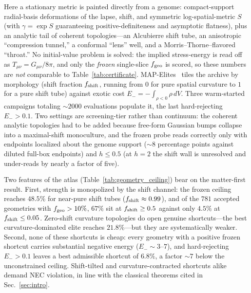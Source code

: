 \documentclass[twocolumn,floatfix,aps,prd,nofootinbib]{revtex4-2}
\begin{document}
Here a stationary metric is painted directly from a genome: compact-support
radial-basis deformations of the lapse, shift, and symmetric log-spatial-metric
$S$ (with $\gamma=\exp S$ guaranteeing positive-definiteness and asymptotic
flatness), plus an analytic tail of coherent topologies---an Alcubierre shift
tube, an anisotropic ``compression tunnel,'' a conformal ``lens'' well, and a
Morris--Thorne--flavored ``throat.'' No initial-value problem is solved: the
implied stress-energy is read off as $T_{\mu\nu}=G_{\mu\nu}/8\pi$, and only the
\emph{frozen} single-slice $f_{\rm geo}$ is scored, so these numbers are
\emph{not} comparable to Table~\ref{tab:certificate}.
MAP-Elites~\cite{mouret15} tiles the archive by morphology (shift fraction
$f_{\rm shift}$, running from $0$ for pure spatial curvature to $1$ for a pure
shift tube) against exotic cost $E_-=-\!\int_{\rho<0}\rho\,dV$. Three
warm-started campaigns totaling ${\sim}2000$ evaluations populate it, the last
hard-rejecting $E_->0.1$. Two settings are screening-tier rather than
continuum: the coherent analytic topologies had to be added because free-form
Gaussian bumps collapse into a maximal-shift monoculture, and the frozen probe
reads correctly only with endpoints localized about the genome support
(${\sim}8$ percentage points against diluted full-box endpoints) and $h\le0.5$
(at $h=2$ the shift wall is unresolved and under-reads by nearly a factor
of five).

Two features of the atlas (Table~\ref{tab:geometry_ceiling}) bear on the
matter-first result. First, strength is monopolized by the shift channel: the
frozen ceiling reaches $48.5\%$ for near-pure shift tubes
($f_{\rm shift}\approx0.99$), and of the $781$ accepted geometries with
$f_{\rm geo}>10\%$, $67\%$ sit at $f_{\rm shift}\ge0.5$ against only $4.5\%$ at
$f_{\rm shift}\le0.05$. Zero-shift curvature topologies do open genuine
shortcuts---the best curvature-dominated elite reaches $21.8\%$---but they are
systematically weaker. Second, none of these shortcuts is cheap: every geometry
with a positive frozen shortcut carries substantial negative energy
($E_-\sim3$--$7$), and hard-rejecting $E_->0.1$ leaves a best admissible
shortcut of $6.8\%$, a factor ${\sim}7$ below the unconstrained ceiling.
Shift-tilted and curvature-contracted shortcuts alike demand NEC violation, in
line with the classical theorems cited in Sec.~\ref{sec:intro}.
\end{document}

